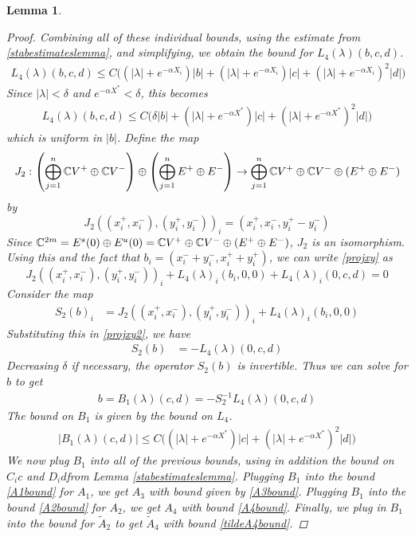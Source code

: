 \documentclass[10pt,reqno]{amsart}
\theoremstyle{plain}
\newtheorem{lemma}[theorem]{Lemma}
\theoremstyle{definition}
\theoremstyle{remark}
\numberwithin{theorem}{section}
\numberwithin{equation}{section}
\begin{document}
\begin{lemma}
\begin{proof}
Combining all of these individual bounds, using the estimate from \cref{stabestimateslemma}, and simplifying, we obtain the bound for $L_4(\lambda)(b, c, d)$.
\begin{align*}
L_4(\lambda)(b, c, d) \leq 
C\Big( (|\lambda| + e^{-\alpha X_i})|b| + (|\lambda|+e^{-\alpha X_i})|c| + (|\lambda| + e^{-\alpha X_i})^2 |d|  \Big) 
\end{align*}
Since $|\lambda| < \delta$ and $e^{-\alpha X^*} < \delta$, this becomes
\begin{align*}
L_4(\lambda)(b, c, d) \leq 
C\Big( \delta |b| + (|\lambda|+e^{-\alpha X^*})|c| + (|\lambda| + e^{-\alpha X^*})^2 |d| \Big) 
\end{align*}
which is uniform in $|b|$. Define the map
\[
J_2: \left( \bigoplus_{j=1}^n \mathbb{C} V^+ \oplus \mathbb{C} V^- \right) \oplus
\left( \bigoplus_{j=1}^n E^+ \oplus E^- \right) 
\rightarrow \bigoplus_{j=1}^n \mathbb{C} V^+ \oplus \mathbb{C} V^- \oplus (E^+ \oplus E^-)
\]
by 
\[
J_2( (x_i^+, x_i^-),(y_i^+, y_i^-))_i = ( x_i^+, x_i^-, y_i^+ - y_i^- )
\]
Since $\mathbb{C}^{2m} = E^s(0) \oplus E^u(0) = \mathbb{C} V^+ \oplus \mathbb{C} V^- \oplus (E^+ \oplus E^-)$, $J_2$ is an isomorphism. Using this and the fact that $b_i = (x_i^- + y_i^-, x_i^+ + y_i^+)$, we can write \eqref{projxy} as
\begin{equation}\label{projxy2}
J_2( (x_i^+, x_i^-),(y_i^+, y_i^-))_i 
+ L_4(\lambda)_i(b_i, 0, 0) + L_4(\lambda)_i(0, c, d) = 0
\end{equation}
Consider the map
\begin{align*}
S_2(b)_i &= J_2( (x_i^+, x_i^-),(y_i^+, y_i^-))_i 
+ L_4(\lambda)_i(b_i, 0, 0) 
\end{align*}
Substituting this in \eqref{projxy2}, we have
\begin{align*}
S_2(b) &= -L_4(\lambda)(0, c, d)
\end{align*}
Decreasing $\delta$ if necessary, the operator $S_2(b)$ is invertible. Thus we can solve for $b$ to get
\begin{align}
b = B_1(\lambda)(c,d) 
= -S_2^{-1} L_4(\lambda)(0, c, d)
\end{align}
The bound on $B_1$ is given by the bound on $L_4$.
\begin{align*}
|B_1(\lambda)(c, d)| \leq C\Big( (|\lambda|+e^{-\alpha X^*})|c| + (|\lambda| + e^{-\alpha X^*})^2 |d| \Big) 
\end{align*}
We now plug $B_1$ into all of the previous bounds, using in addition the bound on $C_i c$ and $D_i d $from Lemma \ref{stabestimateslemma}. Plugging $B_1$ into the bound \eqref{A1bound} for $A_1$, we get $A_3$ with bound given by \cref{A3bound}. Plugging $B_1$ into the bound \eqref{A2bound} for $A_2$, we get $A_4$ with bound \cref{A4bound}. Finally, we plug in $B_1$ into the bound for $\tilde{A}_2$ to get $\tilde{A}_4$ with bound \cref{tildeA4bound}.
\end{proof}
\end{lemma}




\end{document}
